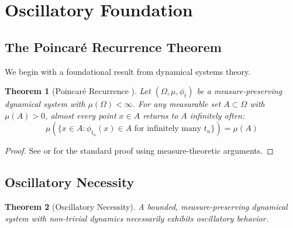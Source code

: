 \documentclass[twocolumn,10pt,a4paper]{article}
\newtheorem{theorem}{Theorem}[section]
\theoremstyle{definition}
\theoremstyle{remark}
\begin{document}
\section{Oscillatory Foundation}
\label{sec:oscillatory}

\subsection{The Poincar\'{e} Recurrence Theorem}

We begin with a foundational result from dynamical systems theory.

\begin{theorem}[Poincar\'{e} Recurrence \cite{poincare1890}]
\label{thm:poincare}
Let $(\Omega, \mu, \phi_t)$ be a measure-preserving dynamical system with $\mu(\Omega) < \infty$. For any measurable set $A \subset \Omega$ with $\mu(A) > 0$, almost every point $x \in A$ returns to $A$ infinitely often:
\begin{equation}
    \mu\left(\{x \in A : \phi_{t_n}(x) \in A \text{ for infinitely many } t_n\}\right) = \mu(A)
\end{equation}
\end{theorem}

\begin{proof}
See \cite{poincare1890} or \cite{walters1982} for the standard proof using measure-theoretic arguments.
\end{proof}

\subsection{Oscillatory Necessity}

\begin{theorem}[Oscillatory Necessity]
\label{thm:oscillatory}
A bounded, measure-preserving dynamical system with non-trivial dynamics necessarily exhibits oscillatory behavior.
\end{theorem}
\end{document}
